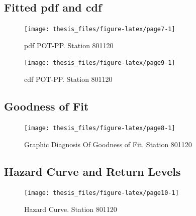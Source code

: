 \documentclass[12pt,oneside]{reedthesis}
\begin{document}
\hypertarget{fitted-pdf-and-cdf}{%
\subsection{Fitted pdf and cdf}\label{fitted-pdf-and-cdf}}

\footnotesize
\begin{figure}

{\centering \texttt{[image: thesis\_files/figure-latex/page7-1]} 

}

\caption{pdf POT-PP. Station 801120}\label{fig:page7}
\end{figure}
\normalsize

\footnotesize
\begin{figure}

{\centering \texttt{[image: thesis\_files/figure-latex/page9-1]} 

}

\caption{cdf POT-PP. Station 801120}\label{fig:page9}
\end{figure}
\normalsize

\hypertarget{goodness-of-fit}{%
\subsection{Goodness of Fit}\label{goodness-of-fit}}

\footnotesize
\begin{figure}

{\centering \texttt{[image: thesis\_files/figure-latex/page8-1]} 

}

\caption{Graphic Diagnosis Of Goodness of Fit. Station 801120}\label{fig:page8}
\end{figure}
\normalsize

\hypertarget{hazard-curve-and-return-levels}{%
\subsection{Hazard Curve and Return Levels}\label{hazard-curve-and-return-levels}}

\footnotesize
\begin{figure}

{\centering \texttt{[image: thesis\_files/figure-latex/page10-1]} 

}

\caption{Hazard Curve. Station 801120}\label{fig:page10}
\end{figure}
\normalsize
\end{document}
